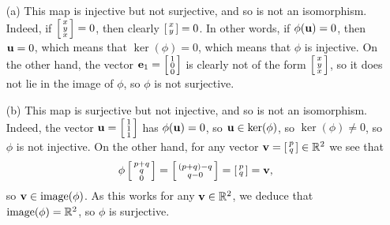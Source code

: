  \begin{itemize}
  \item[(a)] This map is injective but not surjective, and
   so is not an isomorphism.  Indeed, if $\left[\begin{smallmatrix} x\\ y\\ x\end{smallmatrix}\right]=0$,
   then clearly $\left[\begin{smallmatrix} x\\ y\end{smallmatrix}\right]=0$.  In other words, if
   $\phi(\mathbf{u})=0$, then $\mathbf{u}=0$, which means that
   $\ker(\phi)=0$, which means that $\phi$ is injective.  On
   the other hand, the vector $\mathbf{e}_1=\left[\begin{smallmatrix} 1\\0\\0\end{smallmatrix}\right]$ is
   clearly not of the form $\left[\begin{smallmatrix} x\\ y\\ x\end{smallmatrix}\right]$, so it does
   not lie in the image of $\phi$, so $\phi$ is not
   surjective.
  \item[(b)] This map is surjective but not injective, and
   so is not an isomorphism.   Indeed, the vector
   $\mathbf{u}=\left[\begin{smallmatrix} 1\\ 1\\ 1 \end{smallmatrix}\right]$ has $\phi(\mathbf{u})=0$, so
   $\mathbf{u}\in\ker(\phi)$, so $\ker(\phi)\neq 0$, so $\phi$ is
   not injective.  On the other hand, for any vector
   $\mathbf{v}=\left[\begin{smallmatrix} p\\ q\end{smallmatrix}\right]\in{\mathbb{R}}^2$ we see that
   \[ \phi\left[\begin{smallmatrix} p+q\\q\\0\end{smallmatrix}\right] =
       \left[\begin{smallmatrix} (p+q)-q \\ q-0 \end{smallmatrix}\right] = \left[\begin{smallmatrix} p\\ q\end{smallmatrix}\right] = \mathbf{v},
   \]
   so $\mathbf{v}\in\operatorname{image}(\phi)$.  As this works for any
   $\mathbf{v}\in{\mathbb{R}}^2$, we deduce that $\operatorname{image}(\phi)={\mathbb{R}}^2$, so $\phi$
   is surjective.


\end{itemize}
